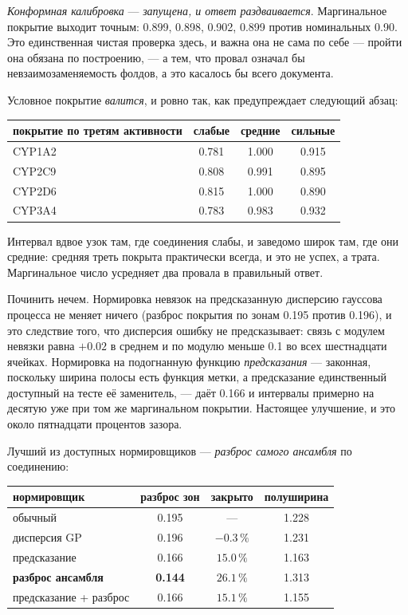 \emph{Конформная калибровка} --- \emph{запущена, и ответ раздваивается}. Маргинальное покрытие
выходит точным: 0.899, 0.898, 0.902, 0.899 против номинальных 0.90. Это единственная чистая
проверка здесь, и важна она не сама по себе --- пройти она обязана по построению, --- а тем, что
провал означал бы невзаимозаменяемость фолдов, а это касалось бы всего документа.

Условное покрытие \emph{валится}, и ровно так, как предупреждает следующий абзац:

\begin{center}
\begin{tabular}{lccc}
\toprule
покрытие по третям активности & слабые & средние & сильные \\
\midrule
CYP1A2 & 0.781 & 1.000 & 0.915 \\
CYP2C9 & 0.808 & 0.991 & 0.895 \\
CYP2D6 & 0.815 & 1.000 & 0.890 \\
CYP3A4 & 0.783 & 0.983 & 0.932 \\
\bottomrule
\end{tabular}
\end{center}

Интервал вдвое узок там, где соединения слабы, и заведомо широк там, где они средние: средняя треть
покрыта практически всегда, и это не успех, а трата. Маргинальное число усредняет два провала в
правильный ответ.

Починить нечем. Нормировка невязок на предсказанную дисперсию гауссова процесса не меняет ничего
(разброс покрытия по зонам 0.195 против 0.196), и это следствие того, что дисперсия ошибку не
предсказывает: связь с модулем невязки равна $+0.02$ в среднем и по модулю меньше 0.1 во всех
шестнадцати ячейках. Нормировка на подогнанную функцию \emph{предсказания} --- законная, поскольку
ширина полосы есть функция метки, а предсказание единственный доступный на тесте её заменитель, ---
даёт 0.166 и интервалы примерно на десятую уже при том же маргинальном покрытии. Настоящее
улучшение, и это около пятнадцати процентов зазора.

Лучший из доступных нормировщиков --- \emph{разброс самого ансамбля} по соединению:

\begin{center}
\begin{tabular}{lccc}
\toprule
нормировщик & разброс зон & закрыто & полуширина \\
\midrule
обычный                & 0.195 & --- & 1.228 \\
дисперсия GP           & 0.196 & $-0.3\,\%$ & 1.231 \\
предсказание           & 0.166 & $15.0\,\%$ & 1.163 \\
\textbf{разброс ансамбля} & \textbf{0.144} & $\mathbf{26.1\,\%}$ & 1.313 \\
предсказание + разброс & 0.166 & $15.1\,\%$ & 1.155 \\
\bottomrule
\end{tabular}
\end{center}

